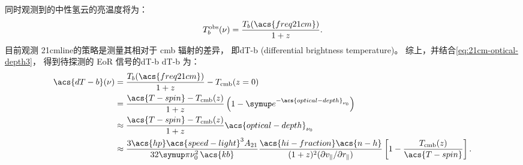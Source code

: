 同时观测到的中性氢云的亮温度将为：
\begin{equation}
  T_b^{\R{obs}}(\nu) = \frac{T_b(\acs{freq21cm})}{1 + z} .
\end{equation}
目前观测 \ac{21cmline}的策略是测量其相对于 \ac{cmb} 辐射的差异，
即\acl{dT-b} (differential brightness temperature)。
综上，并结合\autoref{eq:21cm-optical-depth3}，
得到待探测的 EoR 信号的\acl{dT-b} \ac{dT-b} 为：
\begin{align}
  \acs{dT-b}(\nu)
    & = \frac{T_b(\acs{freq21cm})}{1 + z} - T_{\R{cmb}}(z=0)  \\
    & = \frac{\acs{T-spin} - T_{\R{cmb}}(z)}{1+z}
      \left( 1 - \Ce^{-\acs{optical-depth}_{\nu_0}} \right)  \\
    & \approx \frac{\acs{T-spin} - T_{\R{cmb}}(z)}{1+z}
      \acs{optical-depth}_{\nu_0}  \\
    & \approx \frac{3 \acs{hp} \acs{speed-light}^3 A_{21}}{
      32\Cpi \nu_0^2 \,\acs{kb}}
      \frac{\acs{hi-fraction} \acs{n-h}}{
        (1+z)^2 (\partial v_{\parallel} / \partial r_{\parallel})}
      \left[ 1 - \frac{T_{\R{cmb}}(z)}{\acs{T-spin}} \right] .
    \label{eq:eor-signal1}
\end{align}

